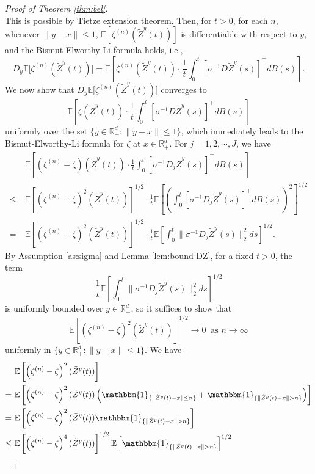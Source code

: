 \documentclass[11pt]{article}
\theoremstyle{definition}
\theoremstyle{plain}
\newcommand{\R}{\mathbb{R}}
\newcommand{\E}{\mathbb{E}}
\newcommand{\mbOne}{\mathbbm{1}}
\begin{document}
\begin{proof}[Proof of Theorem \ref{thm:bel}]
\[\]
This is possible by Tietze extension theorem. Then, for $t>0$, for each $n$, whenever $\|y-x\| \leq 1$, 
$\E\left[\zeta^{(n)}\left(\tilde Z^{y}(t)\right)\right]$ is differentiable with respect to $y$, and the Bismut-Elworthy-Li formula holds, i.e., 
\[
D_y \mathbb{E} \bigl[ \zeta^{(n)}(\tilde Z^y(t)) \bigr]
= \mathbb{E} \left[ \zeta^{(n)}(\tilde Z^y(t)) \cdot \frac{1}{t} \int_0^t \left[\sigma^{-1} D\tilde Z^y(s)\right]^{\top} dB(s) \right].
\]
We now show that $D_y \mathbb{E} \bigl[ \zeta^{(n)}(\tilde Z^y(t)) \bigr]$ converges to 
\[
\mathbb{E} \left[ \zeta(\tilde Z^y(t)) \cdot \frac{1}{t} \int_0^t \left[\sigma^{-1} D\tilde Z^y(s)\right]^{\top} dB(s) \right]
\]
uniformly over the set $\{y \in \R_+^d : \|y-x\|\leq 1\}$, which immediately leads to the Bismut-Elworthy-Li formula 
for $\zeta$ at $x\in \R_+^d$. For $j = 1,2, \cdots, J$, we have 
\begin{align*}
&~\mathbb{E} \left[ \left(\zeta^{(n)}-\zeta \right)(\tilde Z^y(t)) \cdot \frac{1}{t} \int_0^t \left[\sigma^{-1} D_j\tilde Z^y(s)\right]^{\top} dB(s) \right] \\
\le &~ \mathbb{E} \left[ \left(\zeta^{(n)}-\zeta \right)^2(\tilde Z^y(t))\right]^{1/2} \cdot 
\frac{1}{t} \mathbb{E} \left[\left(\int_0^t \left[\sigma^{-1} D_j\tilde Z^y(s)\right]^{\top} dB(s) \right)^2\right]^{1/2} \\
= &~ \mathbb{E} \left[ \left(\zeta^{(n)}-\zeta \right)^2(\tilde Z^y(t))\right]^{1/2} \cdot 
\frac{1}{t} \mathbb{E} \left[\int_0^t \|\sigma^{-1} D_j\tilde Z^y(s)\|^2_2 ds\right]^{1/2}.
\end{align*}
By Assumption \ref{as:sigma} and Lemma \ref{lem:bound-DZ}, for a fixed $t > 0$, the term 
\[
\frac{1}{t} \mathbb{E} \left[\int_0^t \|\sigma^{-1} D_j\tilde Z^y(s)\|^2_2 ds\right]^{1/2}
\]
is uniformly bounded over $y\in \R_+^d$, so it suffices to show that 
\[
\mathbb{E} \left[ \left(\zeta^{(n)}-\zeta \right)^2(\tilde Z^y(t))\right]^{1/2} \to 0 \ \text{ as } n\to \infty
\]
uniformly in $\{y \in \R_+^d : \|y-x\|\leq 1\}$. We have
\begin{align*}
&~\mathbb{E} \left[ \left(\zeta^{(n)}-\zeta \right)^2(\tilde Z^y(t))\right] \\
= &~ \E \left[ \left(\zeta^{(n)}-\zeta \right)^2(\tilde Z^y(t))\left(\mbOne_{\{\|\tilde Z^y(t) - x\|\leq n\}} + \mbOne_{\{\|\tilde Z^y(t) - x\|> n\}}\right)\right] \\
= &~ \E \left[ \left(\zeta^{(n)}-\zeta \right)^2(\tilde Z^y(t))\mbOne_{\{\|\tilde Z^y(t) - x\|> n\}}\right] \\
\le &~\E \left[ \left(\zeta^{(n)}-\zeta \right)^4(\tilde Z^y(t))\right]^{1/2} \E\left[\mbOne_{\{\|\tilde Z^y(t) - x\|> n\}}\right]^{1/2} \\

\end{align*}
\end{proof}
\end{document}

